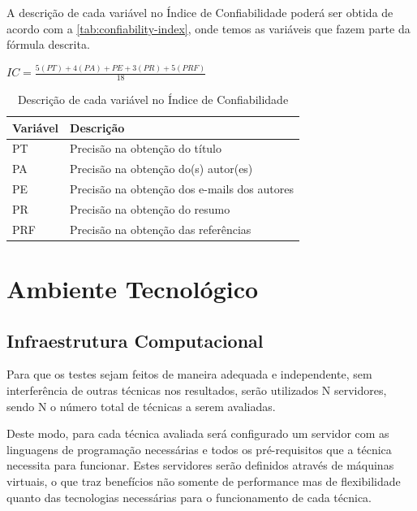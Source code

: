 A descrição de cada variável no Índice de Confiabilidade poderá ser obtida de acordo com a \autoref{tab:confiability-index}, onde temos as variáveis que fazem parte da fórmula descrita.

\begin{center}
    $ IC=\frac{5(PT)+4(PA)+PE+3(PR)+5(PRF)}{18} $
\end{center}

\begin{table}
    \caption{Descrição de cada variável no Índice de Confiabilidade}
    \begin{center}
        \begin{tabular}{|p{3cm}|p{8cm}|}
            \hline \textbf{Variável} & \textbf{Descrição}\\ 
            \hline PT & Precisão na obtenção do título \\
            \hline PA & Precisão na obtenção do(s) autor(es)\\
            \hline PE & Precisão na obtenção dos e-mails dos autores \\
            \hline PR & Precisão na obtenção do resumo \\
            \hline PRF & Precisão na obtenção das referências \\
            \hline 
        \end{tabular} 
    \end{center}
    \label{tab:confiability-index}
\end{table}




\section{Ambiente Tecnológico}
\label{sec:tech-environment}

\subsection{Infraestrutura Computacional}
\label{ssec:computational-structure}

Para que os testes sejam feitos de maneira adequada e independente, sem interferência de outras técnicas nos resultados, serão utilizados N servidores, sendo N o número total de técnicas a serem avaliadas.

Deste modo, para cada técnica avaliada será configurado um servidor com as linguagens de programação necessárias e todos os pré-requisitos que a técnica necessita para funcionar. Estes servidores serão definidos através de máquinas virtuais, o que traz benefícios não somente de performance mas de flexibilidade quanto das tecnologias necessárias para o funcionamento de cada técnica.


